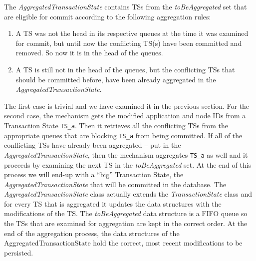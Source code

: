 The \emph{AggregatedTransactionState} contains TSs from the
\emph{toBeAggregated} set that are eligible for commit according to the
following aggregation rules:
\begin{enumerate}
  \item A TS was not the head in its respective queues at the time it
    was examined for commit, but until now the conflicting TS(s) have
    been committed and removed. So now it is in the head of the
    queues.

  \item A TS is still not in the head of the queues, but the
    conflicting TSs that should be committed before, have been already
    aggregated in the \emph{AggregatedTransactionState}.
\end{enumerate}

The first case is trivial and we have examined it in the previous
section. For the second case, the mechanism gets the modified
application and node IDs from a Transaction State \texttt{TS\_a}.
Then it retrieves all the conflicting TSs from the appropriate queues
that are blocking \texttt{TS\_a} from being committed. If all of the
conflicting TSs have already been aggregated -- put in the
\emph{AggregatedTransactionState}, then the mechanism aggregates
\texttt{TS\_a} as well and it proceeds by examining the next TS in the
\emph{toBeAggregated} set. At the end of this process we will end-up
with a ``big'' Transaction State, the
\emph{AggregatedTransactionState} that will be committed in the
database. The \emph{AggregatedTransactionState} class actually extends
the \emph{TransactionState} class and for every TS that is aggregated
it updates the data structures with the modifications of the TS. The
\emph{toBeAggregated} data structure is a FIFO queue so the TSs that
are examined for aggregation are kept in the correct order. At the
end of the aggregation process, the data structures of the
AggregatedTransactionState hold the correct, most recent modifications to be persisted.


